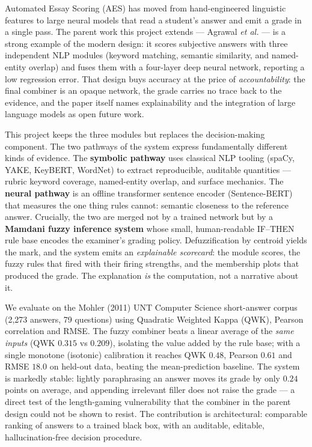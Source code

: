 \documentclass[11pt,a4paper]{article}
\begin{document}
Automated Essay Scoring (AES) has moved from hand-engineered linguistic features
to large neural models that read a student's answer and emit a grade in a single
pass. The parent work this project extends --- Agrawal \emph{et al.}
\cite{agrawal2024} --- is a strong example of the modern design: it scores
subjective answers with three independent NLP modules (keyword matching, semantic
similarity, and named-entity overlap) and fuses them with a four-layer deep neural
network, reporting a low regression error. That design buys accuracy at the price
of \emph{accountability}: the final combiner is an opaque network, the grade
carries no trace back to the evidence, and the paper itself names explainability
and the integration of large language models as open future work.

This project keeps the three modules but replaces the decision-making component.
The two pathways of the system express fundamentally different kinds of evidence.
The \textbf{symbolic pathway} uses classical NLP tooling (spaCy, YAKE, KeyBERT,
WordNet) to extract reproducible, auditable quantities --- rubric keyword
coverage, named-entity overlap, and surface mechanics. The \textbf{neural
pathway} is an offline transformer sentence encoder (Sentence-BERT) that measures
the one thing rules cannot: semantic closeness to the reference answer. Crucially,
the two are merged not by a trained network but by a \textbf{Mamdani fuzzy
inference system} whose small, human-readable IF--THEN rule base encodes the
examiner's grading policy. Defuzzification by centroid yields the mark, and the
system emits an \emph{explainable scorecard}: the module scores, the fuzzy rules
that fired with their firing strengths, and the membership plots that produced
the grade. The explanation \emph{is} the computation, not a narrative about it.

We evaluate on the Mohler (2011) UNT Computer Science short-answer corpus (2{,}273
answers, 79 questions) using Quadratic Weighted Kappa (QWK), Pearson correlation
and RMSE. The fuzzy combiner beats a linear average of the \emph{same inputs}
(QWK $0.315$ vs $0.209$), isolating the value added by the rule base; with a
single monotone (isotonic) calibration it reaches QWK $0.48$, Pearson $0.61$ and
RMSE $18.0$ on held-out data, beating the mean-prediction baseline. The system is
markedly stable: lightly paraphrasing an answer moves its grade by only $0.24$
points on average, and appending irrelevant filler does not raise the grade
--- a direct test of the length-gaming vulnerability that the combiner in the
parent design could not be shown to resist. The contribution is architectural:
comparable ranking of answers to a trained black box, with an auditable,
editable, hallucination-free decision procedure.
\end{document}

